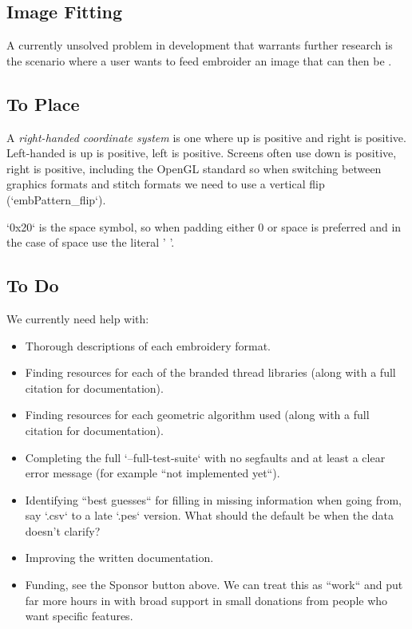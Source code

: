 \subsection{Image Fitting}

A currently unsolved problem in development that warrants further research is
the scenario where a user wants to feed embroider an image that can then be .

\subsection{To Place}

A \emph{right-handed coordinate system} is one where up is positive and right is
positive. Left-handed is up is positive, left is positive. Screens often use
down is positive, right is positive, including the OpenGL standard so when
switching between graphics formats and stitch formats we need to use a vertical
flip (`embPattern\_flip`).

`0x20` is the space symbol, so when padding either 0 or space is preferred and in the case of space use the literal ' '.

\subsection{To Do}

We currently need help with:

\begin{itemize}
\item Thorough descriptions of each embroidery format.
\item Finding resources for each of the branded thread libraries (along with a full citation for documentation).
\item Finding resources for each geometric algorithm used (along with a full citation for documentation).
\item Completing the full `--full-test-suite`  with no segfaults and at least a clear error message (for example ``not implemented yet``).
\item Identifying ``best guesses`` for filling in missing information when going from, say `.csv` to a late `.pes` version. What should the default be when the data doesn't clarify?
\item Improving the written documentation.
\item Funding, see the Sponsor button above. We can treat this as ``work`` and put far more hours in with broad support in small donations from people who want specific features.
\end{itemize}

